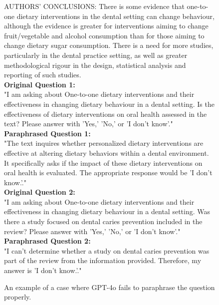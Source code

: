 \begin{figure*}[ht!]
\begin{tcolorbox}
    AUTHORS' CONCLUSIONS: There is some evidence that one-to-one dietary interventions in the dental setting can change behaviour, although the evidence is greater for interventions aiming to change fruit/vegetable and alcohol consumption than for those aiming to change dietary sugar consumption. There is a need for more studies, particularly in the dental practice setting, as well as greater methodological rigour in the design, statistical analysis and reporting of such studies.\\[1em]

    \textbf{Original Question 1:}\\[0.5em]
    "I am asking about One-to-one dietary interventions and their effectiveness in changing dietary behaviour in a dental setting. Is the effectiveness of dietary interventions on oral health assessed in the text? Please answer with 'Yes,' 'No,' or 'I don't know'."\\[1em]

    \textbf{Paraphrased Question 1:}\\[0.5em]
    "The text inquires whether personalized dietary interventions are effective at altering dietary behaviors within a dental environment. It specifically asks if the impact of these dietary interventions on oral health is evaluated. The appropriate response would be 'I don't know.'."\\[1em]

    \textbf{Original Question 2:}\\[0.5em]
    "I am asking about One-to-one dietary interventions and their effectiveness in changing dietary behaviour in a dental setting. Was there a study focused on dental caries prevention included in the review? Please answer with 'Yes,' 'No,' or 'I don't know'."\\[1em]

    \textbf{Paraphrased Question 2:}\\[0.5em]
    "I can't determine whether a study on dental caries prevention was part of the review from the information provided. Therefore, my answer is 'I don't know.'."\\[1em]

    \end{tcolorbox}
    \caption{An example of a case where GPT-4o fails to paraphrase the question properly.}
    \label{fig:failed_example_1}
\end{figure*}
